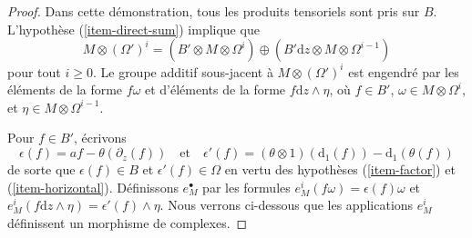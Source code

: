 \begin{proof}
Dans cette démonstration, tous les produits tensoriels sont pris sur $B$.
L'hypothèse (\ref{item-direct-sum}) implique que
$$
M \otimes (\Omega')^i =
(B' \otimes M \otimes \Omega^i)
\oplus
(B' \text{d}z \otimes M \otimes \Omega^{i - 1})
$$
pour tout $i \geq 0$. Le groupe additif sous-jacent à
$M \otimes (\Omega')^i$ est engendré par les éléments de la forme
$f \omega$ et d'éléments de la forme $f \text{d}z \wedge \eta$,
où $f \in B'$, $\omega \in M \otimes \Omega^i$, et
$\eta \in M \otimes \Omega^{i - 1}$.

\medskip\noindent
Pour $f \in B'$, écrivons
$$
\epsilon(f) = af - \theta(\partial_z(f))
\quad\text{et}\quad
\epsilon'(f) = (\theta \otimes 1)(\text{d}_1(f)) - \text{d}_1(\theta(f))
$$
de sorte que $\epsilon(f) \in B$ et $\epsilon'(f) \in \Omega$ en vertu des
hypothèses (\ref{item-factor}) et (\ref{item-horizontal}).
Définissons $e_M^\bullet$ par les formules
$e^i_M(f\omega) = \epsilon(f) \omega$ et
$e^i_M(f \text{d}z \wedge \eta) = \epsilon'(f) \wedge \eta$.
Nous verrons ci-dessous que les applications $e^i_M$ définissent un morphisme de complexes.


\end{proof}
